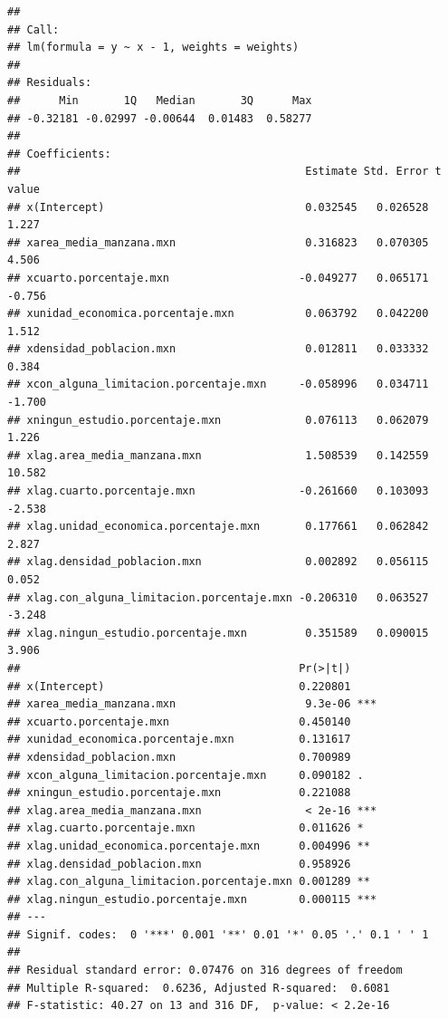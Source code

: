 \documentclass[12pt,]{book}
\newenvironment{Shaded}{\begin{snugshade}}{\end{snugshade}}
\newcommand{\KeywordTok}[1]{\textcolor[rgb]{0.13,0.29,0.53}{\textbf{#1}}}
\newcommand{\DataTypeTok}[1]{\textcolor[rgb]{0.13,0.29,0.53}{#1}}
\newcommand{\StringTok}[1]{\textcolor[rgb]{0.31,0.60,0.02}{#1}}
\newcommand{\CommentTok}[1]{\textcolor[rgb]{0.56,0.35,0.01}{\textit{#1}}}
\newcommand{\OperatorTok}[1]{\textcolor[rgb]{0.81,0.36,0.00}{\textbf{#1}}}
\newcommand{\NormalTok}[1]{#1}
\begin{document}
\begin{Shaded}
\end{Shaded}

\begin{verbatim}
## 
## Call:
## lm(formula = y ~ x - 1, weights = weights)
## 
## Residuals:
##      Min       1Q   Median       3Q      Max 
## -0.32181 -0.02997 -0.00644  0.01483  0.58277 
## 
## Coefficients:
##                                            Estimate Std. Error t value
## x(Intercept)                               0.032545   0.026528   1.227
## xarea_media_manzana.mxn                    0.316823   0.070305   4.506
## xcuarto.porcentaje.mxn                    -0.049277   0.065171  -0.756
## xunidad_economica.porcentaje.mxn           0.063792   0.042200   1.512
## xdensidad_poblacion.mxn                    0.012811   0.033332   0.384
## xcon_alguna_limitacion.porcentaje.mxn     -0.058996   0.034711  -1.700
## xningun_estudio.porcentaje.mxn             0.076113   0.062079   1.226
## xlag.area_media_manzana.mxn                1.508539   0.142559  10.582
## xlag.cuarto.porcentaje.mxn                -0.261660   0.103093  -2.538
## xlag.unidad_economica.porcentaje.mxn       0.177661   0.062842   2.827
## xlag.densidad_poblacion.mxn                0.002892   0.056115   0.052
## xlag.con_alguna_limitacion.porcentaje.mxn -0.206310   0.063527  -3.248
## xlag.ningun_estudio.porcentaje.mxn         0.351589   0.090015   3.906
##                                           Pr(>|t|)    
## x(Intercept)                              0.220801    
## xarea_media_manzana.mxn                    9.3e-06 ***
## xcuarto.porcentaje.mxn                    0.450140    
## xunidad_economica.porcentaje.mxn          0.131617    
## xdensidad_poblacion.mxn                   0.700989    
## xcon_alguna_limitacion.porcentaje.mxn     0.090182 .  
## xningun_estudio.porcentaje.mxn            0.221088    
## xlag.area_media_manzana.mxn                < 2e-16 ***
## xlag.cuarto.porcentaje.mxn                0.011626 *  
## xlag.unidad_economica.porcentaje.mxn      0.004996 ** 
## xlag.densidad_poblacion.mxn               0.958926    
## xlag.con_alguna_limitacion.porcentaje.mxn 0.001289 ** 
## xlag.ningun_estudio.porcentaje.mxn        0.000115 ***
## ---
## Signif. codes:  0 '***' 0.001 '**' 0.01 '*' 0.05 '.' 0.1 ' ' 1
## 
## Residual standard error: 0.07476 on 316 degrees of freedom
## Multiple R-squared:  0.6236, Adjusted R-squared:  0.6081 
## F-statistic: 40.27 on 13 and 316 DF,  p-value: < 2.2e-16
\end{verbatim}
\end{document}
